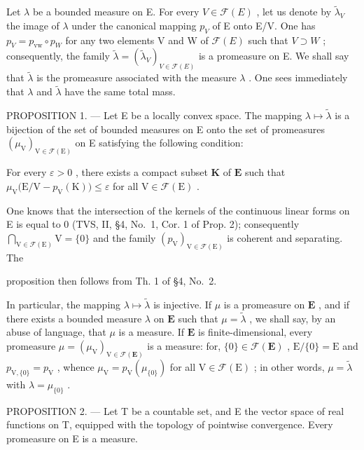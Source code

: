 Let \(\lambda\) be a bounded measure on E. For every \(V \in \mathcal{F}(E)\) , let us denote by \(\widetilde{\lambda}_{V}\) the image of \(\lambda\) under the canonical mapping \(p_{V}\) of E onto E/V. One has \(p_{V} = p_{\mathrm{vw}} \circ p_{W}\) for any two elements V and W of \(\mathcal{F}(E)\) such that \(V \supset W\) ; consequently, the family \(\widetilde{\lambda} = (\widetilde{\lambda}_{V})_{V \in \mathcal{F}(E)}\) is a promeasure on E. We shall say that \(\widetilde{\lambda}\) is the promeasure associated with the measure \(\lambda\) . One sees immediately that \(\lambda\) and \(\widetilde{\lambda}\) have the same total mass.

PROPOSITION 1. --- Let E be a locally convex space. The mapping \(\lambda \mapsto \widetilde{\lambda}\) is a bijection of the set of bounded measures on E onto the set of promeasures \((\mu_{\mathrm{V}})_{\mathrm{V} \in \mathcal{F}(\mathrm{E})}\) on E satisfying the following condition:

For every \(\varepsilon > 0\) , there exists a compact subset \(\mathbf{K}\) of \(\mathbf{E}\) such that \(\mu_{\mathrm{V}}\big(\mathrm{E} / \mathrm{V} - p_{\mathrm{V}}(\mathrm{K})\big) \leqslant \varepsilon\) for all \(\mathrm{V} \in \mathcal{F}(\mathrm{E})\) .

One knows that the intersection of the kernels of the continuous linear forms on E is equal to 0 (TVS, II, §4, No.~1, Cor. 1 of Prop. 2); consequently \(\bigcap_{\mathrm{V} \in \mathcal{F}(\mathrm{E})} \mathrm{V} = \{0\}\) and the family \((p_{\mathrm{V}})_{\mathrm{V} \in \mathcal{F}(\mathrm{E})}\) is coherent and separating. The

proposition then follows from Th. 1 of §4, No.~2.

In particular, the mapping \(\lambda \mapsto \widetilde{\lambda}\) is injective. If \(\mu\) is a promeasure on \(\mathbf{E}\) , and if there exists a bounded measure \(\lambda\) on \(\mathbf{E}\) such that \(\mu = \widetilde{\lambda}\) , we shall say, by an abuse of language, that \(\mu\) is a measure. If \(\mathbf{E}\) is finite-dimensional, every promeasure \(\mu = (\mu_{\mathrm{V}})_{\mathrm{V} \in \mathcal{F}(\mathbf{E})}\) is a measure: for, \(\{0\} \in \mathcal{F}(\mathbf{E})\) , \(\mathrm{E}/\{0\} = \mathrm{E}\) and \(p_{\mathrm{V},\{0\}} = p_{\mathrm{V}}\) , whence \(\mu_{\mathrm{V}} = p_{\mathrm{V}}(\mu_{\{0\}})\) for all \(\mathrm{V} \in \mathcal{F}(\mathrm{E})\) ; in other words, \(\mu = \widetilde{\lambda}\) with \(\lambda = \mu_{\{0\}}\) .

PROPOSITION 2. --- Let T be a countable set, and E the vector space of real functions on T, equipped with the topology of pointwise convergence. Every promeasure on E is a measure.

